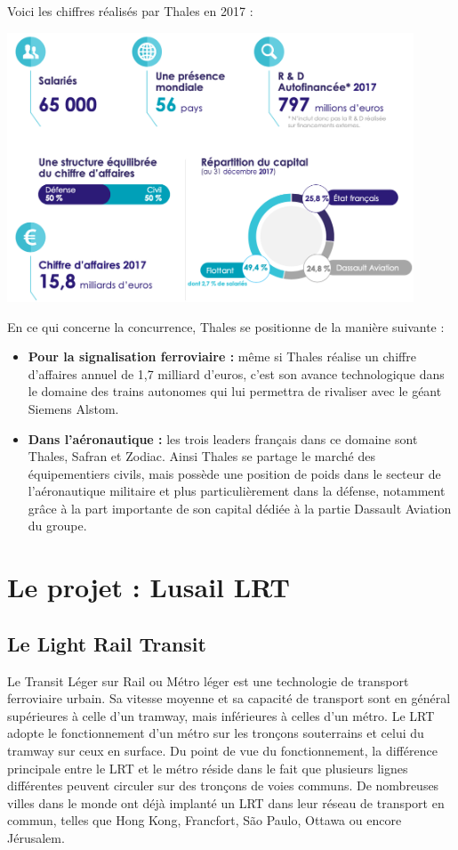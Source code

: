 Voici les chiffres réalisés par Thales en 2017 :

\begin{center}
\includegraphics[height=8cm]{ressources/images/figures/Key.png}
\end{center}

En ce qui concerne la concurrence, Thales se positionne de la manière suivante :
\begin{itemize}
\item \textbf{Pour la signalisation ferroviaire :} même si Thales réalise un chiffre d'affaires annuel de 1,7 milliard d'euros, c'est son avance technologique dans le domaine des trains autonomes qui lui permettra de rivaliser avec le géant Siemens Alstom.
\item \textbf{Dans l'aéronautique :} les trois leaders français dans ce domaine sont Thales, Safran et Zodiac. Ainsi Thales se partage le marché des équipementiers civils, mais possède une position de poids dans le secteur de l'aéronautique militaire et plus particulièrement dans la défense, notamment grâce à la part importante de son capital dédiée à la partie Dassault Aviation du groupe.
\end{itemize}

\section{Le projet : Lusail LRT}
\subsection{Le Light Rail Transit} Le Transit Léger sur Rail ou Métro léger est une technologie de transport ferroviaire urbain. Sa vitesse moyenne et sa capacité de transport sont en général supérieures à celle d'un tramway, mais inférieures à celles d'un métro. Le \gls{LRT} adopte le fonctionnement d'un métro sur les tronçons souterrains et celui du tramway sur ceux en surface.
Du point de vue du fonctionnement, la différence principale entre le \gls{LRT} et le métro réside dans le fait que plusieurs lignes différentes peuvent circuler sur des tronçons de voies communs.
De nombreuses villes dans le monde ont déjà implanté un  \gls{LRT} dans leur réseau de transport en commun, telles que Hong Kong, Francfort, São Paulo, Ottawa ou encore Jérusalem.

